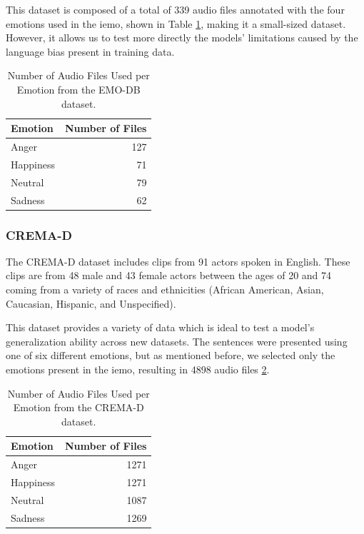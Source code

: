 This dataset is composed of a total of 339 audio files annotated with the four emotions used in the \ac{iemo}, shown in Table \ref{tab:emo_files}, making it a small-sized dataset. However, it allows us to test more directly the models' limitations caused by the language bias present in training data. 

\begin{table}[H]
	\centering
	\label{tab:emo_files}
	\caption{Number of Audio Files Used per Emotion from the EMO-DB dataset.}
	\begin{tabular}{lr}
		\toprule
		Emotion     &   Number of Files \\
		\midrule
		Anger   	&               127 \\
		Happiness   &                71 \\
		Neutral		&                79 \\
		Sadness     &                62 \\
		\bottomrule
	\end{tabular}
\end{table}


\subsubsection{CREMA-D}


The CREMA-D dataset includes clips from 91 actors spoken in English. These clips are from 48 male and 43 female actors between the ages of 20 and 74 coming from a variety of races and ethnicities (African American, Asian, Caucasian, Hispanic, and Unspecified).

This dataset provides a variety of data which is ideal to test a model's generalization ability across new datasets. The sentences were presented using one of six different emotions, but as mentioned before, we selected only the emotions present in the \ac{iemo}, resulting in 4898 audio files \ref{tab:crema_files}. 

\begin{table}[H]
	\centering
	\label{tab:crema_files}
	\caption{Number of Audio Files Used per Emotion from the CREMA-D dataset.}
	\begin{tabular}{lr}
		\toprule
		Emotion     &   Number of Files \\
		\midrule
		Anger   	&              1271 \\
		Happiness   &              1271 \\
		Neutral 	&              1087 \\
		Sadness     &              1269 \\
		\bottomrule
	\end{tabular}
\end{table}


